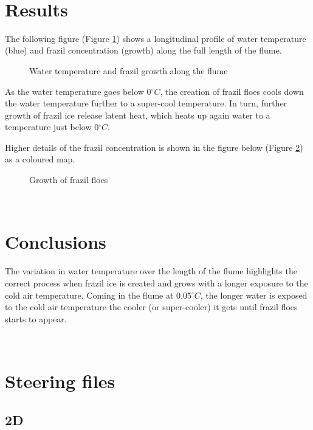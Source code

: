 ~\newline
\section{Results}
The following figure (Figure \ref{fig:growth_temp}) shows a longitudinal profile of water temperature (blue) and frazil concentration (growth) along the full length of the flume.

\begin{figure}[H]
    \begin{center}
    \end{center}
    \caption{Water temperature and frazil growth along the flume}
    \label{fig:growth_temp}
\end{figure}

As the water temperature goes below 0$^\circ C$, the creation of frazil floes cools down the water temperature further to a super-cool temperature. In turn, further growth of frazil ice release latent heat, which heats up again water to a temperature just below 0$^\circ C$.

Higher details of the frazil concentration is shown in the figure below (Figure \ref{fig:growth_frazil}) as a coloured map.

\begin{figure}[H]
    \begin{center}
    \end{center}
    \caption{Growth of frazil floes}
    \label{fig:growth_frazil}
\end{figure}

~\newline
\section{Conclusions}

The variation in water temperature over the length of the flume highlights the correct process when frazil ice is created and grows with a longer exposure to the cold air temperature. Coming in the flume at 0.05$^\circ C$, the longer water is exposed to the cold air temperature the cooler (or super-cooler) it gets until frazil floes starts to appear.

~\newline
\section{Steering files}


\subsection{\telemac2D}



\subsection{\waqtel}



\subsection{\khione}



\renewcommand{\labelitemi}{\textbullet}
